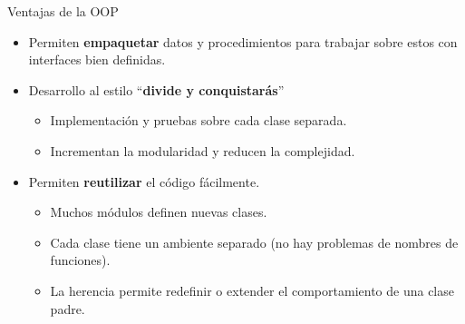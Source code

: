 \documentclass[mathserif]{beamer}
\begin{document}

\begin{frame}[fragile]{Ventajas de la OOP}
    \begin{itemize}
        \item Permiten {\blue\bfseries empaquetar} datos y procedimientos para trabajar sobre estos con interfaces bien definidas.
        
        \item Desarrollo al estilo ``{\blue\bfseries divide y conquistarás}''
        \begin{itemize}
            \item Implementación y pruebas sobre cada clase separada.
            \item Incrementan la modularidad y reducen la complejidad.
        \end{itemize}
        
        \item Permiten {\blue\bfseries reutilizar} el código fácilmente.
        \begin{itemize}
            \item Muchos módulos definen nuevas clases.
            \item Cada clase tiene un ambiente separado (no hay problemas de nombres de funciones).
            \item La {\orange herencia} permite redefinir o extender el comportamiento de una clase padre. 
        \end{itemize}
    \end{itemize}
\end{frame}
\end{document}
